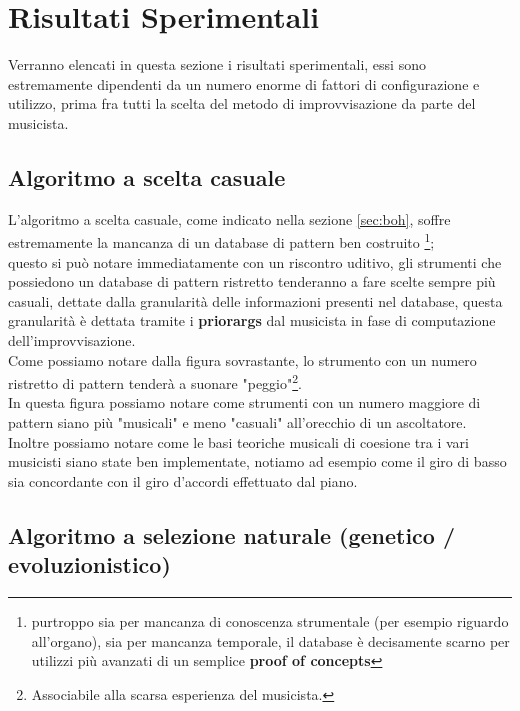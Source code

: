 \section{Risultati Sperimentali}
Verranno elencati in questa sezione i risultati sperimentali, essi
sono estremamente dipendenti da un numero enorme di fattori di configurazione
e utilizzo, prima fra tutti la scelta del metodo di improvvisazione da parte
del musicista.

\subsection{Algoritmo a scelta casuale}
L'algoritmo a scelta casuale, come indicato nella sezione \ref{sec:boh},
soffre estremamente la mancanza di un database di pattern ben costruito
\footnote{purtroppo sia per mancanza di conoscenza strumentale
(per esempio riguardo all'organo), sia per mancanza temporale,
il database è decisamente scarno per utilizzi più avanzati di un semplice
\textbf{proof of concepts}};
\\
questo si può notare immediatamente con un riscontro uditivo,
gli strumenti che possiedono un database di pattern ristretto tenderanno
a fare scelte sempre più casuali, dettate dalla granularità delle informazioni
presenti nel database, questa granularità è dettata tramite i \textbf{priorargs}
dal musicista in fase di computazione dell'improvvisazione.\\
Come possiamo notare dalla figura sovrastante, lo strumento con un numero ristretto
di pattern tenderà a suonare "peggio"\footnote{Associabile alla scarsa esperienza del musicista.}.
\\
In questa figura possiamo notare come strumenti con un numero maggiore di pattern siano
più "musicali" e meno "casuali" all'orecchio di un ascoltatore.\\
Inoltre possiamo notare come le basi teoriche musicali
di coesione tra i vari musicisti siano state ben implementate,
notiamo ad esempio come il giro di basso sia concordante con il giro d'accordi
effettuato dal piano.

\subsection{Algoritmo a selezione naturale (genetico / evoluzionistico)}

